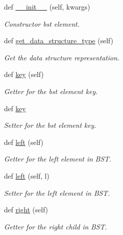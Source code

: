 \begin{DoxyCompactItemize}
\item 
def \mbox{\hyperlink{classbridges_1_1bst__element_1_1_b_s_t_element_ab5f7e1266a3e1777472702f5a3f595c5}{\+\_\+\+\_\+init\+\_\+\+\_\+}} (self, kwargs)
\begin{DoxyCompactList}\small\item\em Constructor bst element. \end{DoxyCompactList}\item 
def \mbox{\hyperlink{classbridges_1_1bst__element_1_1_b_s_t_element_ad6763a7381b91e16d9dc927a6f501c81}{get\+\_\+data\+\_\+structure\+\_\+type}} (self)
\begin{DoxyCompactList}\small\item\em Get the data structure representation. \end{DoxyCompactList}\item 
def \mbox{\hyperlink{classbridges_1_1bst__element_1_1_b_s_t_element_ab8fc663b1168808f83ab157e66c793d9}{key}} (self)
\begin{DoxyCompactList}\small\item\em Getter for the bst element key. \end{DoxyCompactList}\item 
def \mbox{\hyperlink{classbridges_1_1bst__element_1_1_b_s_t_element_a46236bc9db305c61429a56f7ed74df64}{key}}
\begin{DoxyCompactList}\small\item\em Setter for the bst element key. \end{DoxyCompactList}\item 
def \mbox{\hyperlink{classbridges_1_1bst__element_1_1_b_s_t_element_adb40ae0f98fe1cb7f153494c544d3f9f}{left}} (self)
\begin{DoxyCompactList}\small\item\em Getter for the left element in B\+ST. \end{DoxyCompactList}\item 
def \mbox{\hyperlink{classbridges_1_1bst__element_1_1_b_s_t_element_a0b45e63b73faabb6b969dd6222e07942}{left}} (self, l)
\begin{DoxyCompactList}\small\item\em Setter for the left element in B\+ST. \end{DoxyCompactList}\item 
def \mbox{\hyperlink{classbridges_1_1bst__element_1_1_b_s_t_element_a3ec82fbc56a5e6309b69d2d963b483fd}{right}} (self)
\begin{DoxyCompactList}\small\item\em Getter for the right child in B\+ST. \end{DoxyCompactList}\item 

\end{DoxyCompactItemize}
